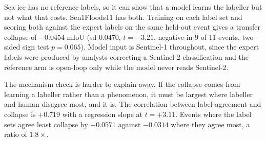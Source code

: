 Sea ice has no reference labels, so it can show that a model learns the labeller but
not what that costs. Sen1Floods11 has both. Training on each label set and scoring
both against the expert labels on the same held-out event gives a transfer collapse
of $-0.0454$ mIoU (sd $0.0470$, $t = -3.21$, negative in 9 of 11 events, two-sided
sign test $p = 0.065$). Model input is Sentinel-1 throughout, since the expert labels
were produced by analysts correcting a Sentinel-2 classification and the reference
arm is open-loop only while the model never reads Sentinel-2.

The mechanism check is harder to explain away. If the collapse comes from learning a
labeller rather than a phenomenon, it must be largest where labeller and human
disagree most, and it is. The correlation between label agreement and collapse is
$+0.719$ with a regression slope at $t = +3.11$. Events where the label sets agree
least collapse by $-0.0571$ against $-0.0314$ where they agree most, a ratio of
$1.8\times$.
